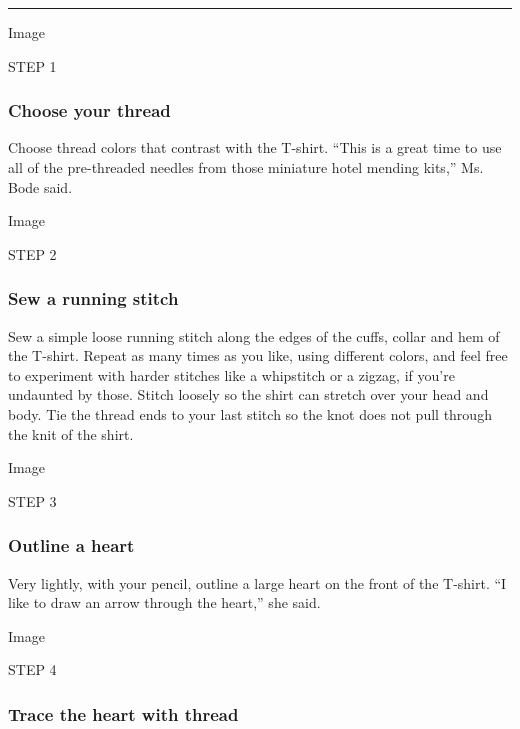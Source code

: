 \begin{center}\rule{0.5\linewidth}{\linethickness}\end{center}

Image

STEP 1

\hypertarget{choose-your-thread}{%
\subsubsection{\texorpdfstring{\textbf{Choose your
thread}}{Choose your thread}}\label{choose-your-thread}}

Choose thread colors that contrast with the T-shirt. ``This is a great
time to use all of the pre-threaded needles from those miniature hotel
mending kits,'' Ms. Bode said.

Image

STEP 2

\hypertarget{sew-a-running-stitch}{%
\subsubsection{\texorpdfstring{\textbf{Sew a running
stitch}}{Sew a running stitch}}\label{sew-a-running-stitch}}

Sew a simple loose running stitch along the edges of the cuffs, collar
and hem of the T-shirt. Repeat as many times as you like, using
different colors, and feel free to experiment with harder stitches like
a whipstitch or a zigzag, if you're undaunted by those. Stitch loosely
so the shirt can stretch over your head and body. Tie the thread ends to
your last stitch so the knot does not pull through the knit of the
shirt.

Image

STEP 3

\hypertarget{outline-a-heart}{%
\subsubsection{\texorpdfstring{\textbf{Outline a
heart}}{Outline a heart}}\label{outline-a-heart}}

Very lightly, with your pencil, outline a large heart on the front of
the T-shirt. ``I like to draw an arrow through the heart,'' she said.

Image

STEP 4

\hypertarget{trace-the-heart-with-thread}{%
\subsubsection{\texorpdfstring{\textbf{Trace the heart with
thread}}{Trace the heart with thread}}\label{trace-the-heart-with-thread}}

